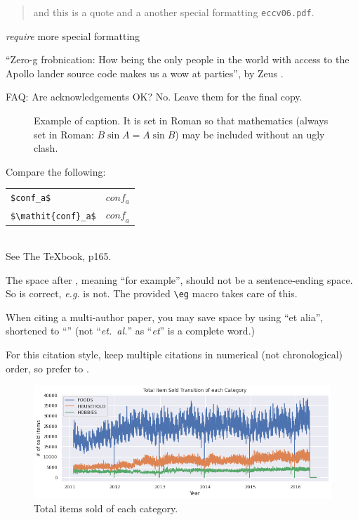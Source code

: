 \documentclass[10pt,twocolumn,letterpaper]{article}
\begin{document}
\begin{quote}
and this is a quote and a another special formatting {\tt eccv06.pdf}.
\end{quote}

{\em require} more special formatting

``Zero-g frobnication: How being the only people in the world with access to
the Apollo lander source code makes us a wow at parties'', by Zeus \etal.

FAQ: Are acknowledgements OK?  No.  Leave them for the final copy.


\begin{figure}[t]
  \begin{center}
    \fbox{\rule{0pt}{2in} \rule{0.9\linewidth}{0pt}}
  \end{center}
    \caption{Example of caption.  It is set in Roman so that mathematics
    (always set in Roman: $B \sin A = A \sin B$) may be included without an
    ugly clash.}
  \label{fig:long}
  \label{fig:onecol}
\end{figure}

\noindent
Compare the following:\\
\begin{tabular}{ll}
 \verb'$conf_a$' &  $conf_a$ \\
 \verb'$\mathit{conf}_a$' & $\mathit{conf}_a$
\end{tabular}\\
See The \TeX book, p165.

The space after \eg, meaning ``for example'', should not be a
sentence-ending space. So \eg is correct, {\em e.g.} is not.  The provided
\verb'\eg' macro takes care of this.

When citing a multi-author paper, you may save space by using ``et alia'',
shortened to ``\etal'' (not ``{\em et.\ al.}'' as ``{\em et}'' is a complete word.)

For this citation style, keep multiple citations in numerical (not
chronological) order, so prefer \cite{Alpher03,Alpher02,Authors06} to
\cite{Alpher02,Alpher03,Authors06}.


\begin{figure}
  \begin{center}
    \includegraphics[width=0.8\linewidth]{img/totalItemSoldofEachCategory.png}
  \end{center}
    \caption{Total items sold of each category.}
  \label{fig:short}
\end{figure}
\end{document}
